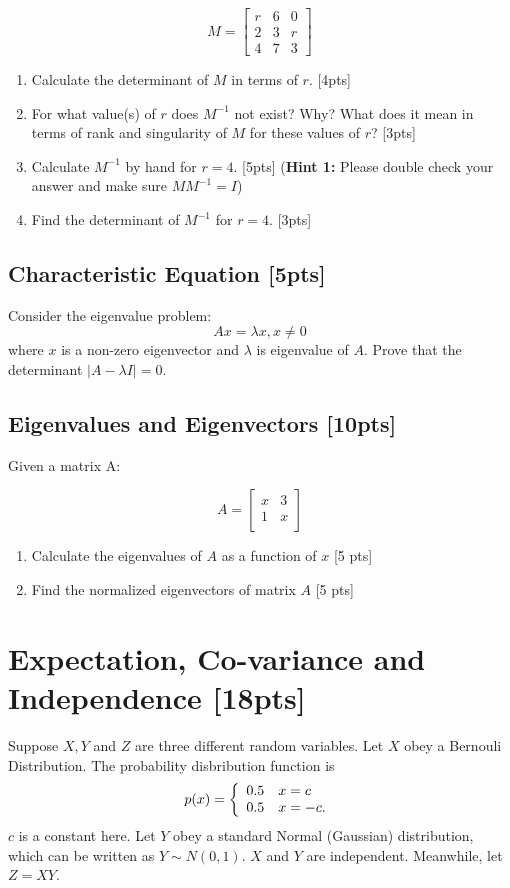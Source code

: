 \documentclass{article}
\begin{document}
$$M = \begin{bmatrix} 
  r & 6 & 0 \\ 
  2 & 3 & r \\
  4 & 7 & 3
  \end{bmatrix}
$$
\begin{enumerate}[label=(\alph*)]
    \item Calculate the determinant of $M$ in terms of $r$.  [4pts] 
    \item For what value(s) of $r$ does $M^{-1}$ not exist? Why? What does it mean in terms of rank and singularity of $M$ for these values of $r$? [3pts]
    \item Calculate $M^{-1}$ by hand for $r = 4$.  [5pts]
    (\textbf{Hint 1:} Please double check your answer and make sure $M M^{-1} = I$) 
    \item Find the determinant of $M^{-1}$ for $r = 4$. [3pts]
\end{enumerate}

\subsection{Characteristic Equation [5pts]}
Consider the eigenvalue problem: 
$$Ax =\lambda x, x \neq 0$$
where $x$ is a non-zero eigenvector and $\lambda$ is eigenvalue of $A$. Prove that the determinant $|A-\lambda I|= 0$. \\


\subsection{Eigenvalues and Eigenvectors [10pts]}
Given a matrix A:

$$A = \begin{bmatrix} 
  x & 3  \\ 
  1 & x \\
  \end{bmatrix}
$$

\begin{enumerate}[label=(\alph*)]
\item Calculate the eigenvalues of $A$ as a function of $x$  [5 pts]
\item Find the normalized eigenvectors of matrix $A$  [5 pts]

\end{enumerate}

\section{Expectation, Co-variance and Independence [18pts]}
Suppose $X, Y$ and $Z$ are three different random variables.
Let $X$ obey a Bernouli Distribution. The probability disbribution function is
    $$p(x)=\left\{
    \begin{array}{c l}	
         0.5 & x = c\\
         0.5 & x = -c.
    \end{array}\right.$$
    $c$ is a constant here.
Let $Y$ obey a standard Normal (Gaussian) distribution, which can be written as $Y \sim N(0,1)$. $X$ and $Y$ are independent. Meanwhile, let $Z = XY$.
\end{document}
